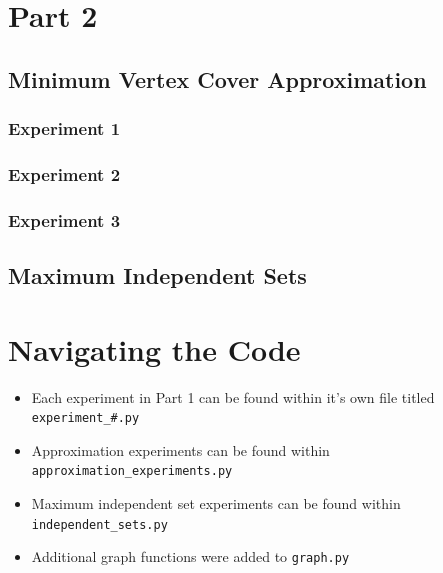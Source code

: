 \documentclass[titlepage]{article}
\begin{document}



\section{Part 2}

\subsection{Minimum Vertex Cover Approximation}

\subsubsection{Experiment 1}



\subsubsection{Experiment 2}



\subsubsection{Experiment 3}



\subsection{Maximum Independent Sets}



\appendix
\section{Navigating the Code}

\begin{itemize}
    \item Each experiment in Part 1 can be found within it's own file titled \verb|experiment_#.py|
    \item Approximation experiments can be found within \verb|approximation_experiments.py|
    \item Maximum independent set experiments can be found within \verb|independent_sets.py|
    \item Additional graph functions were added to \verb|graph.py|
\end{itemize}
\end{document}
